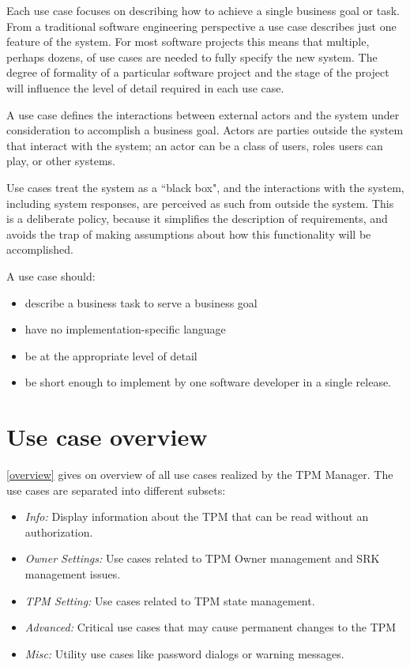 \documentclass[
  american        %
]{sirrixreport}
\begin{document}
  Each use case focuses on describing how to achieve a single business
  goal or task. From a traditional software engineering perspective a
  use case describes just one feature of the system.  For most
  software projects this means that multiple, perhaps dozens, of use
  cases are needed to fully specify the new system.  The degree of
  formality of a particular software project and the stage of the
  project will influence the level of detail required in each use
  case.
 
  A use case defines the interactions between external actors and the
  system under consideration to accomplish a business goal. Actors are
  parties outside the system that interact with the system; an actor
  can be a class of users, roles users can play, or other systems.
 
  Use cases treat the system as a ``black box", and the interactions
  with the system, including system responses, are perceived as such
  from outside the system. This is a deliberate policy, because it
  simplifies the description of requirements, and avoids the trap of
  making assumptions about how this functionality will be
  accomplished.
 
  \noindent A use case should:
 
  \begin{itemize}
  \item describe a business task to serve a business goal
  \item have no implementation-specific language
  \item be at the appropriate level of detail
  \item be short enough to implement by one software developer in a
    single release.
 \end{itemize}

\section{Use case overview} 
\label{sec:overview}
\autoref{overview} gives on overview of all use cases realized by the TPM Manager. The use cases are separated into different subsets:
\begin{itemize}
 \item \emph{Info:} Display information about the TPM that can be read without an authorization.
 \item \emph{Owner Settings:} Use cases related to TPM Owner management and SRK management issues.
 \item \emph{TPM Setting:} Use cases related to TPM state management.
 \item \emph{Advanced:} Critical use cases that may cause permanent changes to the TPM
 \item \emph{Misc:} Utility use cases like password dialogs or warning messages.
\end{itemize}
\end{document}
